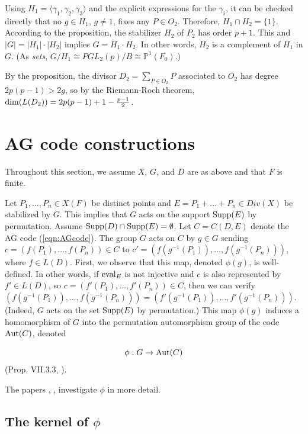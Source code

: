 \documentclass[12pt]{article}
\numberwithin{equation}{section}
\def\ppp{{\mathbb{P}}}
\def\Aut{{\rm{Aut}}}
\def\supp{{\rm{Supp}}}
\def\eval{{\rm{eval}}}
\begin{document}
Using $H_1=\langle \gamma_1,\gamma_2,\gamma_3\rangle $ and the 
explicit expressions for the $\gamma_i$, it can be checked
directly that no $g\in H_1$, $g\not= 1$, fixes any
$P\in O_2$. Therefore, $H_1\cap H_2=\{1\}$.
According to the proposition, 
the stabilizer $H_2$ of $P_2$ has order $p+1$.
This and $|G|=|H_1|\cdot |H_2|$ implies $G=H_1\cdot H_2$.
In other words, $H_2$ is a complement of $H_1$ in $G$.
(As {\it sets}, $G/H_1\cong PGL_2(p)/B\cong \ppp^1(F_0)$.)

By the proposition, the divisor 
$D_2=\sum_{P\in O_2}P$ associated to $O_2$ 
has degree $2p(p-1)>2g$, so by the Riemann-Roch theorem, 
${\rm dim}(L(D_2))=2p(p-1)+1-\frac{p-1}{2}$. 

\section{AG code constructions}


Throughout this section, we assume $X$, $G$, and $D$ are
as above and that $F$ is finite.

Let $P_1,...,P_n\in X(F)$ be distinct points
and $E=P_1+...+P_n\in Div(X)$ be stabilized by $G$. 
This implies that $G$ acts on the support
$\supp(E)$ by permutation.
Assume $\supp(D)\cap \supp(E)=\emptyset$.
Let $C=C(D,E)$ denote the AG code
(\ref{eqn:AGcode}).
The group $G$ acts on $C$ by $g\in G$ sending
$c=(f(P_1),...,f(P_n))\in C$ to 
$c'=(f(g^{-1}(P_1)),...,f(g^{-1}(P_n)))$,
where $f\in L(D)$.
First, we observe that this map, denoted $\phi(g)$, 
is well-defined.
In other words, if $\eval_E$ is not injective and
$c$ is also represented by $f'\in L(D)$, so
$c=(f'(P_1),...,f'(P_n))\in C$, then we can verify
$
(f(g^{-1}(P_1)),...,f(g^{-1}(P_n)))=
(f'(g^{-1}(P_1)),...,f'(g^{-1}(P_n))).
$
(Indeed, $G$ acts on the set
$\supp(E)$ by permutation.)
This map $\phi(g)$ induces a homomorphism of 
$G$ into the permutation
automorphism group of the code ${\rm \Aut}(C)$, denoted 

\begin{equation}
\label{eqn:phi}
\phi:G\rightarrow {\rm \Aut}(C) 
\end{equation}
(Prop. VII.3.3, \cite{Sti}).

The papers \cite{W}, \cite{JT}, \cite{JK1} 
investigate $\phi$ in more detail.

\subsection{The kernel of $\phi$}
\end{document}
